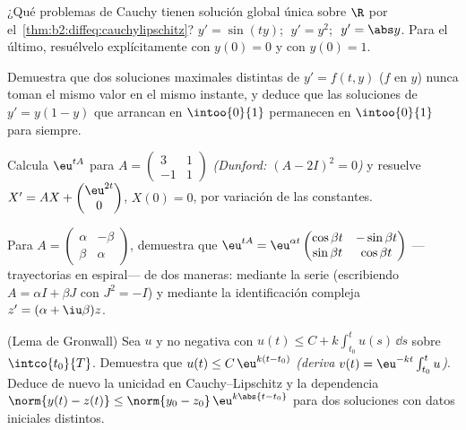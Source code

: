 \begin{exercise}[$\star$]\label{exo:b2:diffeq:2}
¿Qué problemas de Cauchy tienen solución global única sobre $\R$ por
el~\cref{thm:b2:diffeq:cauchylipschitz}? $y' = \sin(ty)$; $\;y' =
y^2$; $\;y' = \abs y$. Para el último, resuélvelo explícitamente con
$y(0) = 0$ y con $y(0) = 1$.
\end{exercise}

\begin{exercise}[$\star$]\label{exo:b2:diffeq:3}
Demuestra que dos soluciones maximales distintas de $y' = f(t,y)$
($f$  en $y$) nunca toman el mismo valor en el mismo
instante, y deduce que las soluciones de $y' = y(1 - y)$ que
arrancan en $\intoo{0}{1}$ permanecen en $\intoo{0}{1}$ para
siempre.
\end{exercise}

\begin{exercise}[$\star\star$]\label{exo:b2:diffeq:4}
Calcula $\eu^{tA}$ para $A = \begin{pmatrix} 3 & 1\\ -1 &
1\end{pmatrix}$ \emph{(Dunford: $(A - 2I)^2 = 0$)} y resuelve $X' =
AX + \begin{pmatrix} \eu^{2t}\\ 0\end{pmatrix}$, $X(0) = 0$, por
variación de las constantes.
\end{exercise}

\begin{exercise}[$\star\star$]\label{exo:b2:diffeq:5}
Para $A = \begin{pmatrix} \alpha & -\beta\\ \beta &
\alpha\end{pmatrix}$, demuestra que $\eu^{tA} = \eu^{\alpha
t}\begin{pmatrix} \cos\beta t & -\sin\beta t\\ \sin\beta t &
\cos\beta t\end{pmatrix}$ ---trayectorias en espiral--- de dos
maneras: mediante la serie (escribiendo $A = \alpha I + \beta J$ con
$J^2 = -I$) y mediante la identificación compleja $z' = (\alpha +
\iu\beta)z$.
\end{exercise}

\begin{exercise}[$\star\star$]\label{exo:b2:diffeq:6}
(Lema de Gronwall) Sea $u$  y no negativa con $u(t) \leq C +
k\int_{t_0}^{t} u(s)\,\dd s$ sobre $\intco{t_0}{T}$. Demuestra que
$u(t) \leq C\,\eu^{k(t - t_0)}$ \emph{(deriva $v(t) =
\eu^{-kt}\int_{t_0}^t u$)}. Deduce de nuevo la unicidad en
Cauchy--Lipschitz y la dependencia  $\norm{y(t) - z(t)} \leq
\norm{y_0 - z_0}\,\eu^{k\abs{t - t_0}}$ para dos soluciones con
datos iniciales distintos.
\end{exercise}

